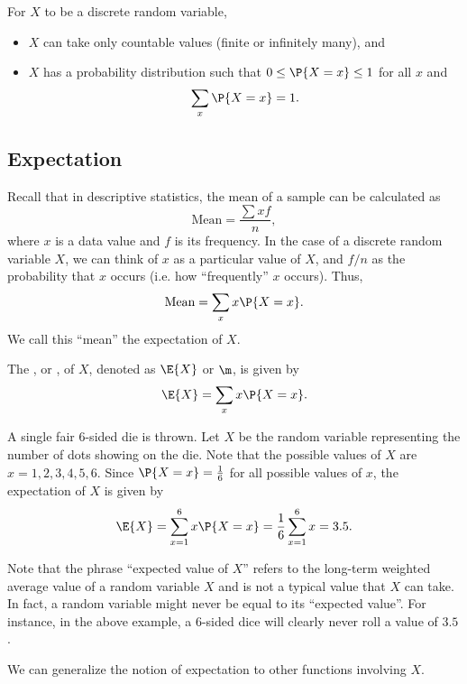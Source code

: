 \begin{condition}
    For $X$ to be a discrete random variable,
    \begin{itemize}
        \item $X$ can take only countable values (finite or infinitely many), and
        \item $X$ has a probability distribution such that $0 \leq \P{X = x} \leq 1$ for all $x$ and \[\sum_{x} \P{X = x} = 1.\]
    \end{itemize}
\end{condition}

\subsection{Expectation}\label{ssec:DRV-Exp}

Recall that in descriptive statistics, the mean of a sample can be calculated as \[\text{Mean} = \frac{\sum xf}{n},\] where $x$ is a data value and $f$ is its frequency. In the case of a discrete random variable $X$, we can think of $x$ as a particular value of $X$, and $f/n$ as the probability that $x$ occurs (i.e. how ``frequently'' $x$ occurs). Thus, \[\text{Mean} = \sum_{x} x \P{X = x}.\] We call this ``mean'' the expectation of $X$.

\begin{definition}
    The , or , of $X$, denoted as $\E{X}$ or $\m$, is given by \[\E{X} = \sum_{x} x \P{X = x}.\]
\end{definition}

\begin{example}
    A single fair 6-sided die is thrown. Let $X$ be the random variable representing the number of dots showing on the die. Note that the possible values of $X$ are $x = 1, 2, 3, 4, 5, 6$. Since $\P{X = x} = \frac16$ for all possible values of $x$, the expectation of $X$ is given by \[\E{X} = \sum_{x = 1}^6 x\P{X = x} = \frac16 \sum_{x= 1}^6 x = 3.5.\]
\end{example}

Note that the phrase ``expected value of $X$'' refers to the long-term weighted average value of a random variable $X$ and is not a typical value that $X$ can take. In fact, a random variable might never be equal to its ``expected value''. For instance, in the above example, a 6-sided dice will clearly never roll a value of $3.5$.

We can generalize the notion of expectation to other functions involving $X$.

